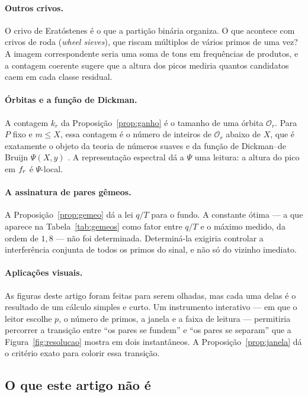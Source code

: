 \paragraph{Outros crivos.} O crivo de Eratóstenes é o que a partição binária
organiza. O que acontece com crivos de roda (\emph{wheel sieves}), que riscam
múltiplos de vários primos de uma vez? A imagem correspondente seria uma soma de
tons em frequências de produtos, e a contagem coerente sugere que a altura dos
picos mediria quantos candidatos caem em cada classe residual.

\paragraph{Órbitas e a função de Dickman.} A contagem $k_r$ da
Proposição~\ref{prop:ganho} é o tamanho de uma órbita $\mathcal O_r$. Para $P$ fixo
e $m\le X$, essa contagem é o número de inteiros de $\mathcal O_r$ abaixo de $X$,
que é exatamente o objeto da teoria de números suaves e da função de
Dickman--de Bruijn $\Psi(X,y)$ \cite{tenenbaum}. A representação espectral dá a
$\Psi$ uma leitura: a altura do pico em $f_{r}$ é $\Psi$-local.

\paragraph{A assinatura de pares gêmeos.} A Proposição~\ref{prop:gemeo} dá a lei
$q/T$ para o fundo. A constante ótima — a que aparece na
Tabela~\ref{tab:gemeos} como fator entre $q/T$ e o máximo medido, da ordem de
$1{,}8$ — não foi determinada. Determiná-la exigiria controlar a interferência
conjunta de todos os primos do sinal, e não só do vizinho imediato.

\paragraph{Aplicações visuais.} As figuras deste artigo foram feitas para serem
olhadas, mas cada uma delas é o resultado de um cálculo simples e curto. Um
instrumento interativo — em que o leitor escolhe $p$, o número de primos, a janela
e a faixa de leitura — permitiria percorrer a transição entre ``os pares se
fundem'' e ``os pares se separam'' que a Figura~\ref{fig:resolucao} mostra em dois
instantâneos. A Proposição~\ref{prop:janela} dá o critério exato para colorir essa
transição.

\subsection{O que este artigo não é}

